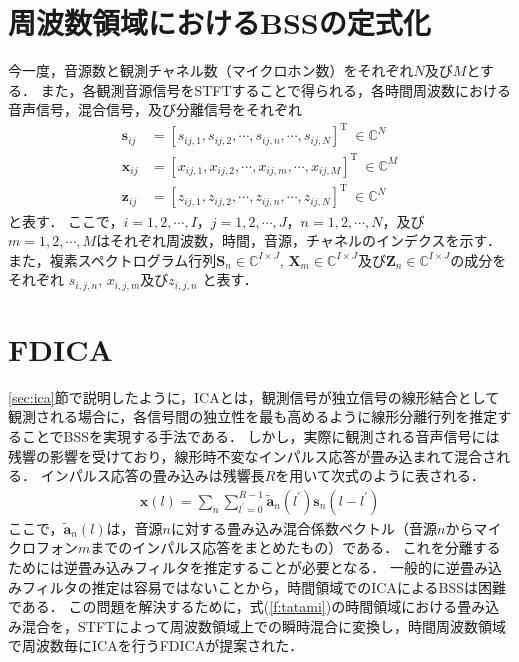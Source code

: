 \section{周波数領域におけるBSSの定式化}
\label{sec:formularization}
今一度，音源数と観測チャネル数（マイクロホン数）をそれぞれ$N$及び$M$とする．
また，各観測音源信号をSTFTすることで得られる，各時間周波数における音声信号，混合信号，及び分離信号をそれぞれ
\begin{align}
  \bm{s}_{ij} &= \left[
	s_{ij,1},s_{ij,2}, \cdots, s_{ij,n}, \cdots, s_{ij,N} 
  \right]^\mathrm{T}~\in \mathbb{C}^{N}\\
  \bm{x}_{ij} &= \left[
      x_{ij,1},x_{ij,2},  \cdots, x_{ij,m}, \cdots  , x_{ij,M} 
  \right]^\mathrm{T}~\in \mathbb{C}^{M} \\
  \bm{z}_{ij} &= \left[
      z_{ij,1},z_{ij,2},  \cdots, z_{ij,n}, \cdots  , z_{ij,N} 
  \right]^\mathrm{T}~\in \mathbb{C}^{N}
\end{align}
と表す．
ここで，$i= 1, 2, \cdots , I$，$j = 1, 2, \cdots , J$，$n = 1, 2, \cdots , N$，及び$m =
1, 2, \cdots , M $はそれぞれ周波数，時間，音源，チャネルのインデクスを示す．
また，複素スペクトログラム行列$\bm{S}_{n} \in \mathbb{C}^{I\times J}$, $\bm{X}_{m} \in \mathbb{C}^{I\times J}$及び$\bm{Z}_{n} \in \mathbb{C}^{I\times J}$の成分をそれぞれ
$s_{i, j, n}$, $x_{i, j, m}$及び$z_{i, j, n}$ と表す．

\section{FDICA}
\label{sec:fdica}
\ref{sec:ica}節で説明したように，ICAとは，観測信号が独立信号の線形結合として観測される場合に，各信号間の独立性を最も高めるように線形分離行列を推定することでBSSを実現する手法である．
しかし，実際に観測される音声信号には残響の影響を受けており，線形時不変なインパルス応答が畳み込まれて混合される．
インパルス応答の畳み込みは残響長$R$を用いて次式のように表される．
\begin{align}
  \bm{x}(l) = \sum_n \sum_{l^{'}=0}^{R-1} \tilde{\bm{a}}_n(l^{'}) \bm{s}_n(l-l^{'})
  \label{f:tatami}
\end{align}
ここで，$\tilde{\bm{a}}_n(l)$は，音源$n$に対する畳み込み混合係数ベクトル（音源$n$からマイクロフォン$m$までのインパルス応答をまとめたもの）である．
これを分離するためには逆畳み込みフィルタを推定することが必要となる．
一般的に逆畳み込みフィルタの推定は容易ではないことから，時間領域でのICAによるBSSは困難である．
この問題を解決するために，式(\ref{f:tatami})の時間領域における畳み込み混合を，STFTによって周波数領域上での瞬時混合に変換し，時間周波数領域で周波数毎にICAを行うFDICAが提案された．

